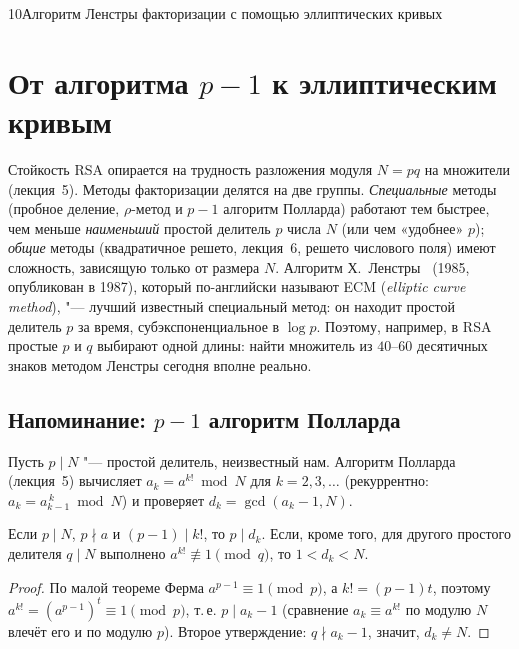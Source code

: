 \begin{lecture}{10}{Алгоритм Ленстры факторизации с помощью эллиптических кривых}

\section{От алгоритма \texorpdfstring{$p - 1$}{p - 1} к эллиптическим кривым}

Стойкость RSA опирается на трудность разложения модуля $N = pq$ на множители (лекция~5).
Методы факторизации делятся на две группы. \emph{Специальные} методы (пробное деление,
$\rho$-метод и $p - 1$ алгоритм Полларда) работают тем быстрее, чем меньше \emph{наименьший}
простой делитель $p$ числа $N$ (или чем «удобнее» $p$); \emph{общие} методы (квадратичное решето,
лекция~6, решето числового поля) имеют сложность, зависящую только от размера $N$. Алгоритм
Х.~Ленстры~\cite{lenstra-ecm} (1985, опубликован в 1987), который по-английски называют
ECM (\emph{elliptic curve method}), "--- лучший известный специальный метод: он находит
простой делитель $p$ за время, субэкспоненциальное в $\log p$. Поэтому, например, в RSA
простые $p$ и $q$ выбирают одной длины: найти множитель из $40$--$60$ десятичных знаков методом
Ленстры сегодня вполне реально.

\subsection{Напоминание: \texorpdfstring{$p - 1$}{p - 1} алгоритм Полларда}

Пусть $p \mid N$ "--- простой делитель, неизвестный нам. Алгоритм Полларда~\cite{pollard-pm1}
(лекция~5) вычисляет $a_k = a^{k!} \bmod N$ для $k = 2, 3, \dots$ (рекуррентно:
$a_k = a_{k-1}^{\,k} \bmod N$) и проверяет $d_k = \gcd(a_k - 1, N)$.

\begin{proposition}\label{l10:pm1}
Если $p \mid N$, $p \nmid a$ и $(p - 1) \mid k!$, то $p \mid d_k$. Если, кроме того, для
другого простого делителя $q \mid N$ выполнено $a^{k!} \not\equiv 1 \pmod q$, то
$1 < d_k < N$.
\end{proposition}

\begin{proof}
По малой теореме Ферма $a^{p-1} \equiv 1 \pmod p$, а $k! = (p - 1) t$, поэтому
$a^{k!} = (a^{p-1})^t \equiv 1 \pmod p$, т.\,е. $p \mid a_k - 1$ (сравнение $a_k \equiv a^{k!}$
по модулю $N$ влечёт его и по модулю $p$). Второе утверждение: $q \nmid a_k - 1$, значит,
$d_k \ne N$.
\end{proof}


\end{lecture}
